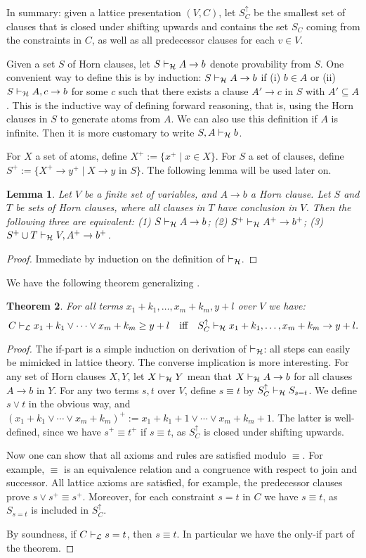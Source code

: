 \documentclass[11pt,a4paper]{article}
\newtheorem{theorem}{Theorem}[section]
\newtheorem{lemma}[theorem]{Lemma}
\newcommand\set[1]{\{#1\}}
\newcommand\jterm[3]{{{#1_1}+{#2_1}}\vee\cdots\vee{{#1_#3}+{#2_#3}}}
\newcommand\jbody[3]{{{#1_1}+{#2_1}},\ldots,{{#1_#3}+{#2_#3}}}
\newcommand\lathy{{\cal L}}
\newcommand\prvL{\vdash_{\lathy}}
\newcommand\prvH{\vdash_{\cal H}}
\begin{document}
In summary: given a lattice presentation $(V,C)$,
let $S^\uparrow_C$ be the smallest set of clauses that 
is closed under shifting upwards and contains
the set $S_C$ coming from the constraints in $C$,
as well as all predecessor clauses for each $v\in V$. 

Given a set $S$ of Horn clauses,
let $S\prvH A\to b$ denote provability from $S$.
One convenient way to define this is by induction:
$S\prvH A\to b$ if 
(i) $b\in A$ or 
(ii) $S\prvH A,c\to b$ for some $c$ such that there exists
a clause $A'\to c$ in $S$ with $A'\subseteq A$.
This is the inductive way of defining forward reasoning,
that is, using the Horn clauses in $S$ to generate atoms from $A$.
We can also use this definition if $A$ is infinite.
Then it is more customary to write $S,A \prvH b$.

For $X$ a set of atoms, define $X^+ := \set{x^+\mid x\in X}$.
For $S$ a set of clauses, define 
$S^+ := \set{X^+\to y^+ \mid \text{$X\to y$ in $S$}}$.
The following lemma will be used later on.

\begin{lemma}\label{lem:shift-up}
Let $V$ be a finite set of variables, and $A\to b$ a Horn clause.
Let $S$ and $T$ be sets of Horn clauses, where all clauses in $T$ 
have conclusion \emph{in} $V$. Then the following three are equivalent:
(1) $S\prvH A\to b$; (2) $S^+\prvH A^+\to b^+$; (3) $S^+ \cup T \prvH V,A^+\to b^+$.
\end{lemma} 
\begin{proof} 
Immediate by induction on the definition of $\prvH$.
\end{proof}


We have the following theorem generalizing \cite[Theorem 3]{Lorenzen51}.

\begin{theorem}\label{thm:LvsH}
For all terms $\jbody{x}{k}{m},y+l$ over $V$ we have:
\[
C\prvL \jterm{x}{k}{m}\geq y+l 
\quad\text{iff}\quad
S^\uparrow_C\prvH \jbody{x}{k}{m}\to y+l.
\]
\end{theorem} 
\begin{proof}
The if-part is a simple induction on derivation of $\prvH$:
all steps can easily be mimicked in lattice theory.
The converse implication is more interesting.
For any set of Horn clauses $X,Y$, let $X \prvH Y$ mean
that $X \prvH A\to b$ for all clauses $A\to b$ in $Y$.
For any two terms $s,t$ over $V$, define $s\equiv t$ by
$S^\uparrow_C \prvH S_{s=t}$. We define $s\vee t$ in the obvious way,
and $(\jterm{x}{k}{m})^+ := x_1+k_1+1 \vee\cdots\vee x_m+k_m+1$.
The latter is well-defined, since we have $s^+\equiv t^+$ 
if $s\equiv t$, as $S^\uparrow_C$ is closed under shifting upwards.

Now one can show that all axioms and rules are satisfied modulo $\equiv$. 
For example, $\equiv$ is an equivalence relation and
a congruence with respect to join and successor.
All lattice axioms are satisfied, for example,
the predecessor clauses prove $s\vee s^+ \equiv s^+$. 
Moreover, for each constraint $s=t$ in $C$ 
we have $s\equiv t$, as $S_{s=t}$ is included in $S^\uparrow_C$.

By soundness, if $C\prvL s=t$, then $s\equiv t$.
In particular we have the only-if part of the theorem.
\end{proof}
\end{document}
